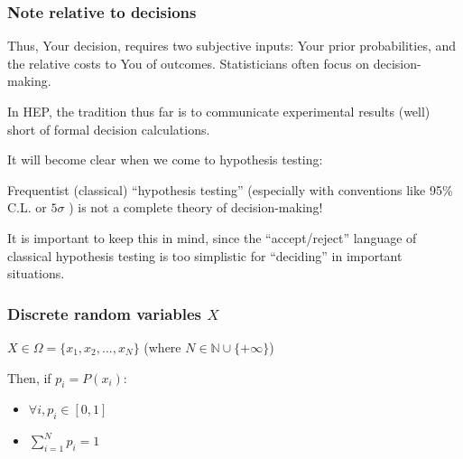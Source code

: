 \documentclass[9pt]{beamer}
\begin{document}
\begin{frame}
\frametitle{Note relative to decisions}

Thus, Your decision, requires two subjective inputs: Your prior
probabilities, and the relative costs to You of outcomes.
Statisticians often focus on decision-making.

In HEP, the tradition thus far is to communicate experimental
results (well) short of formal decision calculations.

It will become clear when we come to hypothesis testing: 

Frequentist (classical) ``hypothesis testing'' (especially with
conventions like 95\% C.L. or $5\sigma$ ) is not a complete theory of
decision-making!

It is important to keep this in mind, since the ``accept/reject''
language of classical hypothesis testing is too
simplistic for ``deciding'' in important situations.

\end{frame}


\begin{frame}
 \frametitle{Discrete random variables $X$}
 
 
  $X \in \Omega = \{ x_1, x_2, \dots, x_N \}$ (where $N \in \mathbb{N} \cup \{+\infty\}$)
  
  Then, if $p_i = P(x_i)$:
  
  \begin{itemize}
   \item $\forall i, p_i \in [0,1]$
   \item $\sum_{i=1}^N p_i = 1$
  \end{itemize}

 \end{frame}
 
\end{document}
